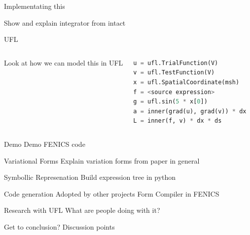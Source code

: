 \begin{frame}{Implementating this}
  \begin{outline}
    \1 Show and explain integrator from intact
  \end{outline}
\end{frame}

\begin{frame}[fragile]{UFL}
  \begin{columns}
  \begin{outline}
    \1 Look at how we can model this in UFL
  \end{outline}

  \begin{lstlisting}[language=Python]
u = ufl.TrialFunction(V)
v = ufl.TestFunction(V)
x = ufl.SpatialCoordinate(msh)
f = <source expression> 
g = ufl.sin(5 * x[0])
a = inner(grad(u), grad(v)) * dx
L = inner(f, v) * dx * ds
  \end{lstlisting}
  \end{columns}
\end{frame}

\begin{frame}{Demo}
Demo FENICS code
\end{frame}

\begin{frame}{Variational Forms}
Explain variation forms from paper in general
\end{frame}

\begin{frame}{Symbollic Represenation}
  Build expression tree in python
\end{frame}

\begin{frame}{Code generation}
  Adopted by other projects
  Form Compiler in FENICS
\end{frame}

\begin{frame}{Research with UFL}
  What are people doing with it?
\end{frame}

\begin{frame}{Get to conclusion?}
  Discussion points
\end{frame}

